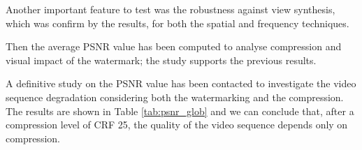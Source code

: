  
\begin{table}[h!]
\begin{center}
\caption{Frequency detection statistic for a quality degradation of $1\%$.\label{tab:03}}
\end{center}
\end{table}
 
 
 
\begin{table}[h!]
\begin{center}
\caption{Frequency detection statistic for a quality degradation of $3\%$.\label{tab:06}}
\end{center}
\end{table}



Another important feature to test was the robustness against view synthesis, which was confirm by the results, for both the spatial and frequency techniques.

Then the average PSNR value has been computed to analyse compression and visual impact of the watermark; the study supports the previous results.

A definitive study on the PSNR value has been contacted to investigate the video sequence degradation considering both the watermarking and the compression. The results are shown in Table \ref{tab:psnr_glob} and we can conclude that, after a compression level of CRF 25, the quality of the video sequence depends only on compression.\\

